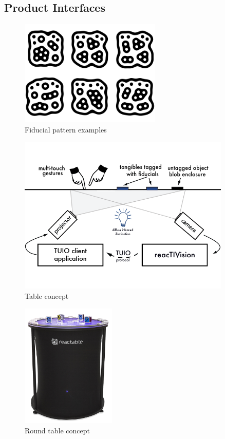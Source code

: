 \subsection{Product Interfaces}

\begin{figure}[H]
	\centering
   	\includegraphics[width=0.6\textwidth]{images/reactivision02}
    \caption{Fiducial pattern examples}
\end{figure}

\begin{figure}[H]
	\centering
   	\includegraphics[width=0.9\textwidth]{images/reactivision03}
    \caption{Table concept }
\end{figure}

\begin{figure}[H]
	\centering
   	\includegraphics[width=0.4\textwidth]{images/ReacTable-live-6-instrument}
    \caption{Round table concept}
\end{figure}

